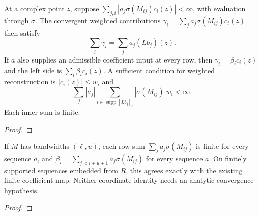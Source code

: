 \begin{theorem}
\label{thm:series-matrix-reconstruction}
\leanok
At a complex point $z$, suppose
$\sum_{j,i}|a_j\sigma(M_{ij})c_i(z)|<\infty$, with evaluation through $\sigma$.
The convergent weighted contributions
$\gamma_i=\sum_j a_j\sigma(M_{ij})c_i(z)$ then satisfy
\[
 \sum_i\gamma_i=\sum_j a_j(Lb_j)(z).
\]
If $a$ also supplies an admissible coefficient input at every row, then
$\gamma_i=\beta_i c_i(z)$ and the left side is $\sum_i\beta_i c_i(z)$.
A sufficient condition for weighted reconstruction is $|c_i(z)|\le w_i$ and
\[
 \sum_j |a_j|\sum_{i\in\operatorname{supp}[Lb_j]_c}|\sigma(M_{ij})|w_i<\infty.
\]
Each inner sum is finite.
\end{theorem}
\begin{proof}
\leanok
\end{proof}



\begin{supporting}
\begin{theorem}
\label{thm:banded-series-coefficient-map}
\leanok
If $M$ has bandwidths $(\ell,u)$, each row sum $\sum_j a_j\sigma(M_{ij})$ is finite for every sequence $a$, and
$\beta_i=\sum_{j<i+u+1}a_j\sigma(M_{ij})$ for every sequence $a$.
On finitely supported sequences embedded from $R$, this agrees exactly with the
existing finite coefficient map. Neither coordinate identity needs an
analytic convergence hypothesis.
\end{theorem}
\begin{proof}
\leanok
\end{proof}

\end{supporting}

